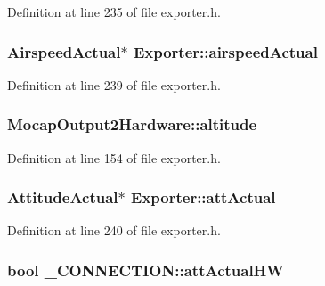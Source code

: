 Definition at line 235 of file exporter.\-h.

\hypertarget{group___mo_cap_plugin_ga933ba2309643df8ddd342ae4cf010fca}{
\subsubsection[{airspeed\-Actual}]{\setlength{\rightskip}{0pt plus 5cm}Airspeed\-Actual$\ast$ Exporter\-::airspeed\-Actual\hspace{0.3cm}{\ttfamily [protected]}}}\label{group___mo_cap_plugin_ga933ba2309643df8ddd342ae4cf010fca}


Definition at line 239 of file exporter.\-h.

\hypertarget{group___mo_cap_plugin_ga6f5725506a151cfd49e1c6b80c2e948f}{
\subsubsection[{altitude}]{ Mocap\-Output2\-Hardware\-::altitude}}\label{group___mo_cap_plugin_ga6f5725506a151cfd49e1c6b80c2e948f}


Definition at line 154 of file exporter.\-h.

\hypertarget{group___mo_cap_plugin_gaa96960187d095cbbc69ba0cc08d776a7}{
\subsubsection[{att\-Actual}]{\setlength{\rightskip}{0pt plus 5cm}Attitude\-Actual$\ast$ Exporter\-::att\-Actual\hspace{0.3cm}{\ttfamily [protected]}}}\label{group___mo_cap_plugin_gaa96960187d095cbbc69ba0cc08d776a7}


Definition at line 240 of file exporter.\-h.

\hypertarget{group___mo_cap_plugin_ga4d9a7f3563731377f2905f1b18e17d52}{
\subsubsection[{att\-Actual\-H\-W}]{\setlength{\rightskip}{0pt plus 5cm}bool \-\_\-\-C\-O\-N\-N\-E\-C\-T\-I\-O\-N\-::att\-Actual\-H\-W}}\label{group___mo_cap_plugin_ga4d9a7f3563731377f2905f1b18e17d52}


